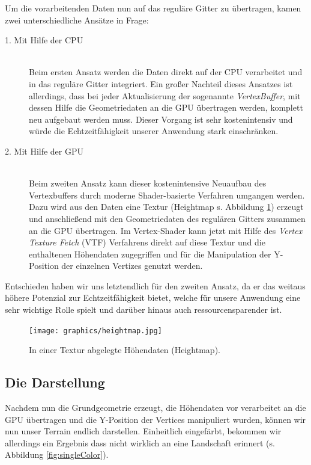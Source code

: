 \begin{Spacing}{\mylinespace}
Um die vorarbeitenden Daten nun auf das reguläre Gitter zu übertragen, kamen zwei unterschiedliche Ansätze in Frage:
\begin{description}
	\item[1. Mit Hilfe der CPU] \hfill \\
	Beim ersten Ansatz werden die Daten direkt auf der CPU verarbeitet und in das reguläre Gitter integriert. Ein großer Nachteil dieses Ansatzes ist allerdings, dass bei jeder Aktualisierung der sogenannte \textit{VertexBuffer}, mit dessen Hilfe die Geometriedaten an die GPU übertragen werden, komplett neu aufgebaut werden muss. Dieser Vorgang ist sehr kostenintensiv und würde die Echtzeitfähigkeit unserer Anwendung stark einschränken.
	\item[2. Mit Hilfe der GPU] \hfill \\
	Beim zweiten Ansatz kann dieser kostenintensive Neuaufbau des Vertexbuffers durch moderne Shader-basierte Verfahren umgangen werden. Dazu wird aus den Daten eine Textur (Heightmap s. Abbildung \ref{fig:heightmap}) erzeugt und anschließend mit den Geometriedaten des regulären Gitters zusammen an die GPU übertragen. Im Vertex-Shader kann jetzt mit Hilfe des \textit{Vertex Texture Fetch} (VTF) Verfahrens direkt auf diese Textur und die enthaltenen Höhendaten zugegriffen und für die Manipulation der Y-Position der einzelnen Vertizes genutzt werden.
\end{description}

Entschieden haben wir uns letztendlich für den zweiten Ansatz, da er das weitaus höhere Potenzial zur Echtzeitfähigkeit bietet, welche für unsere Anwendung eine sehr wichtige Rolle spielt und darüber hinaus auch ressourcensparender ist. 

\begin{figure}[h!]
	\centering
	\vspace*{20px}
	\texttt{[image: graphics/heightmap.jpg]}
	\caption{In einer Textur abgelegte Höhendaten (Heightmap).}
	\label{fig:heightmap}
\end{figure}

\subsection{Die Darstellung}
Nachdem nun die Grundgeometrie erzeugt, die Höhendaten vor verarbeitet an die GPU übertragen und die Y-Position der Vertices manipuliert wurden, können wir nun unser Terrain endlich darstellen. Einheitlich eingefärbt, bekommen wir allerdings ein Ergebnis dass nicht wirklich an eine Landschaft erinnert (s. Abbildung \ref{fig:singleColor}). 


\end{Spacing}
